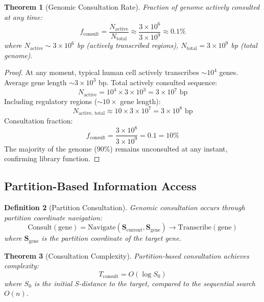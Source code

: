 \documentclass[11pt,a4paper]{article}
\newtheorem{theorem}{Theorem}[section]
\newtheorem{definition}[theorem]{Definition}
\theoremstyle{remark}
\newcommand{\Scoord}{\mathbf{S}}
\begin{document}
\begin{theorem}[Genomic Consultation Rate]
\label{thm:consultation_rate}
Fraction of genome actively consulted at any time:
\begin{equation}
f_{\text{consult}} = \frac{N_{\text{active}}}{N_{\text{total}}} \approx \frac{3 \times 10^6}{3 \times 10^9} \approx 0.1\%
\end{equation}
where $N_{\text{active}} \sim 3 \times 10^6$ bp (actively transcribed regions), $N_{\text{total}} = 3 \times 10^9$ bp (total genome).
\end{theorem}

\begin{proof}
At any moment, typical human cell actively transcribes $\sim 10^4$ genes. Average gene length $\sim 3 \times 10^3$ bp. Total actively consulted sequence:
\begin{equation}
N_{\text{active}} = 10^4 \times 3 \times 10^3 = 3 \times 10^7 \text{ bp}
\end{equation}
Including regulatory regions ($\sim 10\times$ gene length):
\begin{equation}
N_{\text{active, total}} \approx 10 \times 3 \times 10^7 = 3 \times 10^8 \text{ bp}
\end{equation}
Consultation fraction:
\begin{equation}
f_{\text{consult}} = \frac{3 \times 10^8}{3 \times 10^9} = 0.1 = 10\%
\end{equation}
The majority of the genome (90\%) remains unconsulted at any instant, confirming library function.
\end{proof}

\subsection{Partition-Based Information Access}

\begin{definition}[Partition Consultation]
\label{def:partition_consultation}
Genomic consultation occurs through partition coordinate navigation:
\begin{equation}
\text{Consult}(\text{gene}) = \text{Navigate}(\Scoord_{\text{current}}, \Scoord_{\text{gene}}) \to \text{Transcribe}(\text{gene})
\end{equation}
where $\Scoord_{\text{gene}}$ is the partition coordinate of the target gene.
\end{definition}

\begin{theorem}[Consultation Complexity]
\label{thm:consultation_complexity}
Partition-based consultation achieves complexity:
\begin{equation}
T_{\text{consult}} = O(\log S_0)
\end{equation}
where $S_0$ is the initial S-distance to the target, compared to the sequential search $O(n)$.
\end{theorem}
\end{document}
